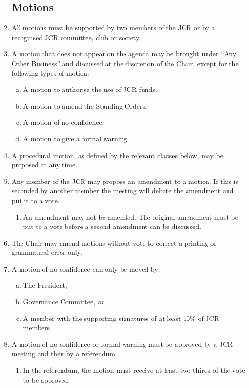 \documentclass[12pt]{article}
\begin{document}
\begin{enumerate}
    \subsection{Motions}
    \item All motions must be supported by two members of the JCR or by a recognised JCR committee, club or society.
    \item A motion that does not appear on the agenda may be brought under ``Any Other Business'' and discussed at the discretion of the Chair, except for the following types of motion:
    \begin{enumerate}[(a)]
        \item A motion to authorise the use of JCR funds.
        \item A motion to amend the Standing Orders.
        \item A motion of no confidence.
        \item A motion to give a formal warning.
    \end{enumerate}
    \item A procedural motion, as defined by the relevant clauses below, may be proposed at any time.
    \item Any member of the JCR may propose an amendment to a motion. If this is seconded by another member the meeting will debate the amendment and put it to a vote.
    \begin{enumerate}
        \item An amendment may not be amended. The original amendment must be put to a vote before a second amendment can be discussed.
    \end{enumerate}
    \item The Chair may amend motions without vote to correct a printing or grammatical error only.
    \item A motion of no confidence can only be moved by:
    \begin{enumerate}[(a)]
        \item The President,
        \item Governance Committee, \emph{or}
        \item A member with the supporting signatures of at least 10\% of JCR members.
    \end{enumerate}
    \item A motion of no confidence or formal warning must be approved by a JCR meeting and then by a referendum.
    \begin{enumerate}
        \item In the referendum, the motion must receive at least two-thirds of the vote to be approved.
    \end{enumerate}

\end{enumerate}
\end{document}
